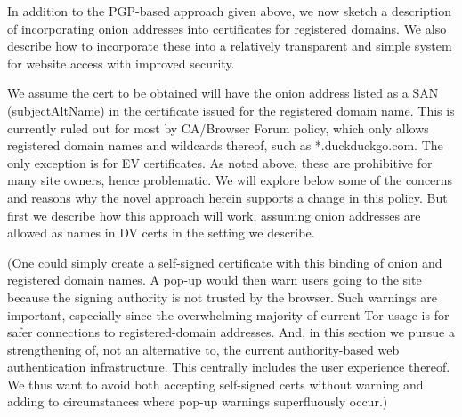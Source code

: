 \documentclass[10pt, conference, compsocconf]{styles/IEEEtran}
\begin{document}
In addition to the PGP-based approach given above,
we now sketch a description of incorporating onion addresses into
certificates for registered domains. We also describe how to
incorporate these into a relatively transparent and simple system for
website access with improved security. 


We assume the cert to be obtained will have the onion address listed
as a SAN (subjectAltName) in the certificate issued for the registered
domain name.  This is currently ruled out for most by CA/Browser Forum policy,
which only allows registered domain names and wildcards thereof, such
as *.duckduckgo.com. The only exception is for EV
certificates.  As noted above, these are prohibitive for many site
owners, hence problematic. We will explore below some of the concerns
and reasons why the novel approach herein supports a change in this
policy. But first we describe how this approach will work, assuming
onion addresses are allowed as names in DV certs in the setting
we describe.

(One could simply create a self-signed certificate with this binding of
onion and registered domain names. A pop-up would then warn users
going to the site because the signing authority is not trusted by the
browser.  Such warnings are important, especially since the
overwhelming majority of current Tor usage is for safer connections to
registered-domain addresses. And, in this section we pursue a
strengthening of, not an alternative to, the current authority-based
web authentication infrastructure. This centrally includes the user
experience thereof. We thus want to avoid both accepting self-signed
certs without warning and adding to circumstances where pop-up
warnings superfluously occur.)
\end{document}
